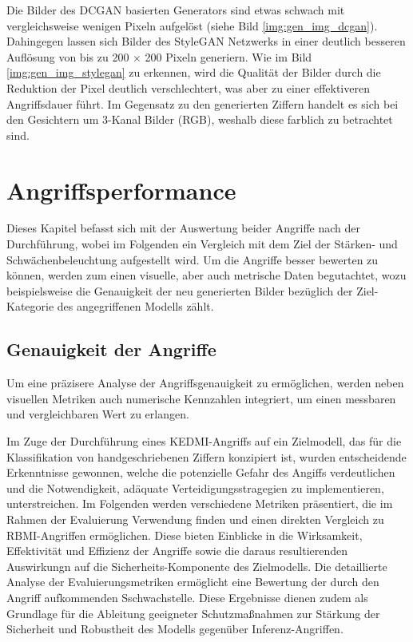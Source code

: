 Die Bilder des DCGAN basierten Generators sind etwas schwach mit vergleichsweise wenigen Pixeln aufgelöst (siehe Bild \ref{img:gen_img_dcgan}). Dahingegen lassen sich Bilder des StyleGAN Netzwerks in einer deutlich besseren Auflösung von bis zu 200 $\times$ 200 Pixeln generiern. Wie im Bild \ref{img:gen_img_stylegan} zu erkennen, wird die Qualität der Bilder durch die Reduktion der Pixel deutlich verschlechtert, was aber zu einer effektiveren Angriffsdauer führt. Im Gegensatz zu den generierten Ziffern handelt es sich bei den Gesichtern um 3-Kanal Bilder (RGB), weshalb diese farblich zu betrachtet sind.
\section{Angriffsperformance}
Dieses Kapitel befasst sich mit der Auswertung beider Angriffe nach der Durchführung, wobei im Folgenden ein Vergleich mit dem Ziel der Stärken- und Schwächenbeleuchtung aufgestellt wird. Um die Angriffe besser bewerten zu können, werden zum einen visuelle, aber auch metrische Daten begutachtet, wozu beispielsweise die Genauigkeit der neu generierten Bilder bezüglich der Ziel-Kategorie des \glqq angegriffenen\grqq{} Modells zählt.
\subsection{Genauigkeit der Angriffe}
Um eine präzisere Analyse der Angriffsgenauigkeit zu ermöglichen, werden neben visuellen Metriken auch numerische Kennzahlen integriert, um einen messbaren und vergleichbaren Wert zu erlangen.

Im Zuge der Durchführung eines \glqq KEDMI\grqq-Angriffs auf ein Zielmodell, das für die Klassifikation von handgeschriebenen Ziffern konzipiert ist, wurden entscheidende Erkenntnisse gewonnen, welche die potenzielle Gefahr des Angiffs verdeutlichen und die Notwendigkeit, adäquate Verteidigungsstragegien zu implementieren, unterstreichen. Im Folgenden werden verschiedene Metriken präsentiert, die im Rahmen der Evaluierung Verwendung finden und einen direkten Vergleich zu \glqq RBMI\grqq-Angriffen ermöglichen. Diese bieten Einblicke in die Wirksamkeit, Effektivität und Effizienz der Angriffe sowie die daraus resultierenden Auswirkungn auf die Sicherheits-Komponente des Zielmodells. Die detaillierte Analyse der Evaluierungsmetriken ermöglicht eine Bewertung der durch den Angriff aufkommenden Sschwachstelle. Diese Ergebnisse dienen zudem als Grundlage für die Ableitung geeigneter Schutzmaßnahmen zur Stärkung der Sicherheit und Robustheit des Modells gegenüber Inferenz-Angriffen.

